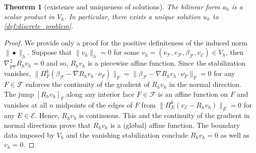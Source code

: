 \documentclass[a4paper]{amsart}
\numberwithin{equation}{section}
\def\F{\mathcal{F}}
\def\E{\mathcal{E}}
\def\T{\mathcal{T}}
\def\pw{\mathrm{pw}}
\newtheorem{theorem}{Theorem}[section]
\theoremstyle{definition}
\theoremstyle{remark}
\numberwithin{theorem}{section}
\numberwithin{equation}{section}
\numberwithin{table}{section}
\numberwithin{figure}{section}
\begin{document}
\begin{theorem}[existence and uniqueness of solutions]\label{thm:wellposedness}
    The bilinear form $a_h$ is a scalar product in $V_h$. In particular, there exists a unique solution $u_h$ to \eqref{def:discrete_problem}.
\end{theorem}
\begin{proof}
    We provide only a proof for the positive definiteness of the induced norm $\|\bullet\|_h$. Suppose that $\|v_h\|_h = 0$ for some $v_h = (v_\T, v_\F, \beta_\F, v_\E) \in V_h$, then $\nabla^2_\pw R_h v_h = 0$ and so, $R_h v_h$ is a piecewise affine function. Since the stabilization vanishes,
    $\|\Pi_F^k(\beta_\F - \nabla R_h v_h \cdot \nu_F)\|_F = \|\beta_\F - \nabla R_h v_h \cdot \nu_F\|_F = 0$ for any $F \in \F$ enforces the continuity of the gradient of $R_h v_h$ in the normal direction. 
    The jump $[R_h v_h]_F$ along any interior face $F \in \F$ is an affine function on $F$ and vanishes at all $n$ midpoints of the edges of $F$ from 
    $\|\Pi_E^k(v_\E - R_h v_h)\|_E = 0$ for any $E \in \E$. Hence, $R_h v_h$ is continuous. This and the continuity of the gradient in normal directions prove that $R_h v_h$ is a (global) affine function. The boundary data imposed by $V_h$ and the vanishing stabilization conclude $R_h v_h = 0$ as well as $v_h = 0$.
\end{proof}
\end{document}
